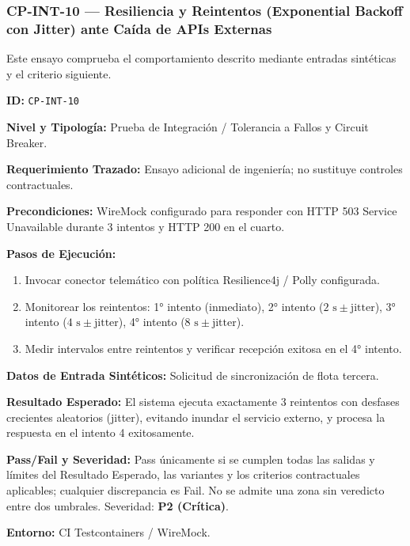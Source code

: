 \subsubsection*{CP-INT-10 — Resiliencia y Reintentos (Exponential Backoff con Jitter) ante Caída de APIs Externas}\label{sec:9-cp-int-10}
Este ensayo comprueba el comportamiento descrito mediante entradas sintéticas y el criterio siguiente.

\par\noindent\textbf{ID:} \texttt{C\allowbreak{}P\allowbreak{}-\allowbreak{}I\allowbreak{}N\allowbreak{}T\allowbreak{}-\allowbreak{}1\allowbreak{}0\allowbreak{}}\par
\par\noindent\textbf{Nivel y Tipología:} Prueba de Integración / Tolerancia a Fallos y Circuit Breaker.\par
\par\noindent\textbf{Requerimiento Trazado:} Ensayo adicional de ingeniería; no sustituye controles contractuales.\par
\par\noindent\textbf{Precondiciones:} WireMock configurado para responder con HTTP 503 Service Unavailable durante 3 intentos y HTTP 200 en el cuarto.\par
\par\noindent\textbf{Pasos de Ejecución:} \par
\begin{enumerate}
\item Invocar conector telemático con política Resilience4j / Polly configurada.
\item Monitorear los reintentos: 1° intento (inmediato), 2° intento (\(2\text{ s} \pm \text{jitter}\)), 3° intento (\(4\text{ s} \pm \text{jitter}\)), 4° intento (\(8\text{ s} \pm \text{jitter}\)).
\item Medir intervalos entre reintentos y verificar recepción exitosa en el 4° intento.
\end{enumerate}
\par\noindent\textbf{Datos de Entrada Sintéticos:} Solicitud de sincronización de flota tercera.\par
\par\noindent\textbf{Resultado Esperado:} El sistema ejecuta exactamente 3 reintentos con desfases crecientes aleatorios (jitter), evitando inundar el servicio externo, y procesa la respuesta en el intento 4 exitosamente.\par
\par\noindent\textbf{Pass/Fail y Severidad:} Pass únicamente si se cumplen todas las salidas y límites del Resultado Esperado, las variantes y los criterios contractuales aplicables; cualquier discrepancia es Fail. No se admite una zona sin veredicto entre dos umbrales. Severidad: \textbf{P2 (Crítica)}.\par
\par\noindent\textbf{Entorno:} CI Testcontainers / WireMock.\par






